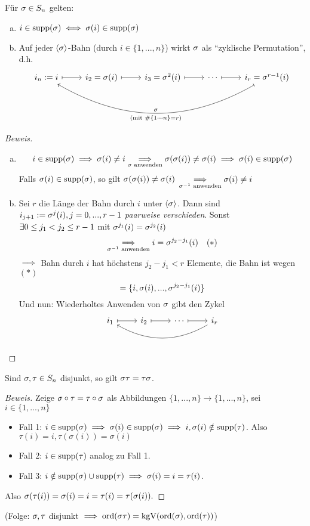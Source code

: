 \documentclass[a4paper]{report}
\begin{document}
\begin{kor}
  Für $\sigma \in S_n$ gelten:
  \begin{enumerate}[(a)]
    \item $i \in \operatorname{supp} (\sigma) \iff \sigma(i) \in \operatorname{supp}(\sigma)$
    \item  Auf jeder $\langle\sigma\rangle$-Bahn (durch $i \in \{1, ..., n\}$) wirkt $\sigma$ als ``zyklische Permutation'', d.h.
          \[\begin{tikzcd}
i_n:=i \arrow[r, maps to] & i_2=\sigma(i) \arrow[r, maps to] & i_3 = \sigma^2(i) \arrow[r, maps to] & \cdots \arrow[r, maps to] & i_r = \sigma^{r-1}(i) \arrow[llll, "\sigma"', "(\text{mit } \# \{1\cdots  n\} = r)", maps to, bend left]
\end{tikzcd}\]
  \end{enumerate}
\end{kor}
\begin{proof}[Beweis]
\begin{enumerate}[(a)]
  \item \[i \in \operatorname{supp}(\sigma) \implies \sigma(i) \ne i \underset{\sigma \text{ anwenden}} {\implies} \sigma(\sigma(i)) \ne \sigma(i) \implies \sigma(i) \in \operatorname{supp}(\sigma)\]
        Falls $\sigma(i) \in \operatorname{supp}(\sigma)$, so gilt $\sigma(\sigma(i)) \ne \sigma(i)$
        \(\underset{\sigma^{-1} \text{ anwenden}} {\implies} \sigma(i) \ne i\)
  \item Sei $r$ die Länge der Bahn durch $i$ unter $\langle\sigma\rangle$. Dann sind $i_{j+1}:= \sigma^{j}(i), j = 0, ..., r-1$ \emph{paarweise verschieden}. Sonst $\exists 0 \le j_1 < j_{2} \le r-1$ mit $\sigma^{j_{1}}(i) = \sigma^{j_{2}}(i)$
        \[\underset{\sigma^{-1} \text{ anwenden}} {\implies} i = \sigma^{j_{2} - j_{1}}(i) \quad (*)\]
        \(\implies\) Bahn durch $i$ hat höchstens $j_{2} - j_{1} < r$ Elemente, die Bahn ist wegen $(*)$ \[= \{i, \sigma(i), ..., \sigma^{j_{2}-j_{1}}(i)\}\]
        Und nun: Wiederholtes Anwenden von $\sigma$ gibt den Zykel
        \[\begin{tikzcd}
i_1 \arrow[r, maps to] & i_2 \arrow[r, maps to] & \cdots \arrow[r, maps to] & i_r \arrow[lll, bend left]
\end{tikzcd} \qedhere \]
\end{enumerate}
\end{proof}

\begin{lemm}
  Sind $\sigma, \tau \in S_n$ disjunkt, so gilt $\sigma \tau = \tau \sigma$.
\end{lemm}

\begin{proof}[Beweis]
  Zeige $\sigma \circ \tau = \tau \circ \sigma$ als Abbildungen $\{1, ..., n\} \to \{1, ..., n\}$, sei $i \in \{1, ..., n\}$
  \begin{itemize}
    \item Fall 1: $i \in \operatorname{supp}(\sigma) \implies \sigma(i) \in \operatorname{supp}(\sigma) \implies i, \sigma(i) \notin \operatorname{supp}(\tau)$.
          Also $\tau(i) = i, \tau(\sigma(i)) = \sigma(i)$
    \item Fall 2: $i \in \operatorname{supp}(\tau)$ analog zu Fall 1.
    \item Fall 3: $i \notin \operatorname{supp}(\sigma) \cup \operatorname{supp}(\tau) \implies \sigma(i) = i = \tau(i)$.
  \end{itemize}
Also $\sigma(\tau(i)) = \sigma(i) = i = \tau(i) = \tau(\sigma(i)).$
\end{proof}
(Folge: $\sigma, \tau$ disjunkt $\implies \operatorname{ord}(\sigma \tau) = \operatorname{kgV}(\operatorname{ord}(\sigma), \operatorname{ord}(\tau))$)
\end{document}
